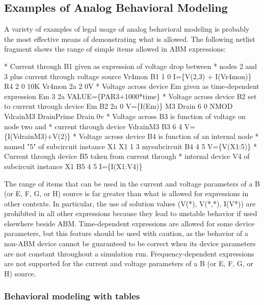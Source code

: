 \subsection{Examples of Analog Behavioral Modeling}

A variety of examples of legal usage of analog behavioral modeling is
probably the most effective means of demonstrating what is
allowed. The following netlist fragment shows the range of 
simple items allowed in ABM  expressions:

\begin{vquote}
\color{blue}* Current through B1 given as expression of voltage drop between 
* nodes 2 and 3 plus current through voltage source Vr4mon\color{black}
B1  1  0  I=\{V(2,3) + I(Vr4mon)\}
R4  2  0  10K
Vr4mon  2a 2  0V
\color{blue}* Voltage across device Em given as time-dependent expression \color{black}
Em  3  2a  VALUE=\{PAR3+1000*time\}
\color{blue}* Voltage across device B2 set to  current through device Em\color{black}
B2  2a  0  V=\{I(Em)\}
M3  Drain  6  0  NMOD
VdrainM3 DrainPrime Drain 0v
\color{blue}* Voltage across B3 is function of voltage on node two and 
* current through device VdrainM3\color{black}
B3  6  4  V=\{I(VdrainM3)+V(2)\}
\color{blue}* Voltage across device B4 is function of an internal node 
* named "5" of subcircuit instance X1\color{black}
X1 1 3 mysubcircuit
B4 4 5 V=\{V(X1:5)\}
\color{blue}* Current through device B5 taken from current through 
* internal device V4 of subcircuit instance X1\color{black}
B5 4 5 I=\{I(X1:V4)\}
\end{vquote}

The range of items that can be used in the current and voltage
parameters of a B (or E, F, G, or H) source is far greater than what
is allowed for expressions in other contexts. In particular, the use
of solution values (V(*), V(*,*), I(V*)) are prohibited in all other
expressions because they lead to unstable behavior if used
elsewhere beside ABM. Time-dependent expressions are allowed for some device
parameters, but this feature should be used with caution, as the
behavior of a non-ABM device cannot be guaranteed to be correct when its 
device parameters are not constant throughout a simulation run.
Frequency-dependent expressions are not supported for the current and voltage
parameters of a B (or E, F, G, or H) source.

\subsubsection{Behavioral modeling with tables}



